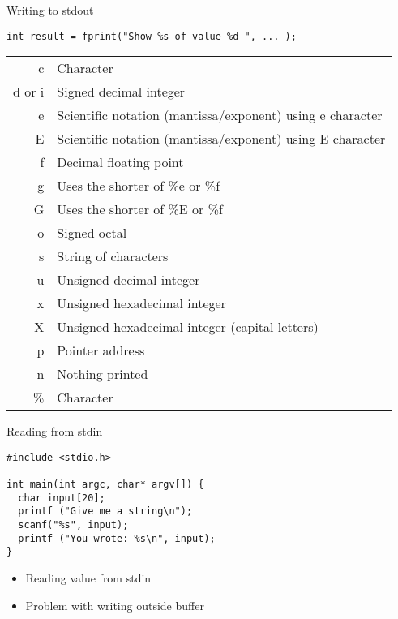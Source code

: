 \documentclass{beamer}
\begin{document}






\begin{frame}[fragile]{Writing to stdout}
\begin{lstlisting}[frame=single]
int result = fprint("Show %s of value %d ", ... );
\end{lstlisting}

\begin{tabular}{rl}
c &Character \\
d or i & Signed decimal integer \\
e & Scientific notation (mantissa/exponent) using e character \\
E & Scientific notation (mantissa/exponent) using E character \\
f & Decimal floating point \\
g & Uses the shorter of \%e or \%f \\
G & Uses the shorter of \%E or \%f \\
o & Signed octal \\
s & String of characters \\
u & Unsigned decimal integer \\
x & Unsigned hexadecimal integer \\
X & Unsigned hexadecimal integer (capital letters) \\
p & Pointer address \\
n & Nothing printed \\
\% & Character \\
\end{tabular}
\end{frame}


\begin{frame}[fragile]{Reading from stdin}
\begin{lstlisting}[frame=single]
#include <stdio.h>

int main(int argc, char* argv[]) {
  char input[20];
  printf ("Give me a string\n");
  scanf("%s", input);
  printf ("You wrote: %s\n", input);
}
\end{lstlisting}
\begin{itemize}
\item Reading value from stdin
\pause
\item Problem with writing outside buffer
\end{itemize}
\end{frame}
\end{document}
